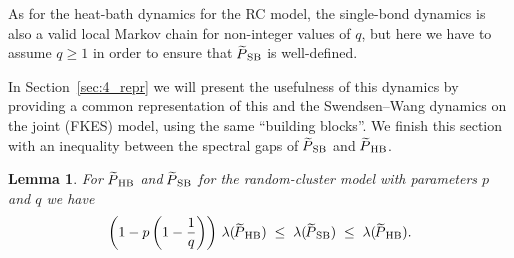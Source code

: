 \documentclass{dis}
\newtheorem{lemma}[theorem]{Lemma}
\theoremstyle{citing}
\begin{document}
As for the heat-bath dynamics for the RC model, the single-bond 
dynamics is also a valid local Markov chain for non-integer 
values of $q$, but here we have to assume $q\ge1$ in order to 
ensure that ${{\raisebox{2pt}{ ${\widetilde{{}}}$ }\mkern-14mu P}_{\rm SB}}$ is well-defined.

In Section~\ref{sec:4_repr} we will present the usefulness of this 
dynamics by providing a common representation of this and 
the Swendsen--Wang dynamics on the joint ({FKES}) model, 
using the same ``building blocks''. 
We finish this section with an inequality between 
the spectral gaps of ${{\raisebox{2pt}{ ${\widetilde{{}}}$ }\mkern-14mu P}_{\rm SB}}$ and ${{\raisebox{2pt}{ ${\widetilde{{}}}$ }\mkern-14mu P}_{\rm HB}}$. 

\begin{lemma} \label{lemma:SB-HB}
For ${{\raisebox{2pt}{ ${\widetilde{{}}}$ }\mkern-14mu P}_{\rm HB}}$ and ${{\raisebox{2pt}{ ${\widetilde{{}}}$ }\mkern-14mu P}_{\rm SB}}$ for the random-cluster model with 
parameters $p$ and $q$ we have
\[
\left(1-p \left(1-\frac1q\right)\right)\, \lambda({{\raisebox{2pt}{ ${\widetilde{{}}}$ }\mkern-14mu P}_{\rm HB}}) 
\;\le\; \lambda({{\raisebox{2pt}{ ${\widetilde{{}}}$ }\mkern-14mu P}_{\rm SB}}) 
	\;\le\; \lambda({{\raisebox{2pt}{ ${\widetilde{{}}}$ }\mkern-14mu P}_{\rm HB}}). 
\]
\end{lemma}
\vspace{4mm}
\end{document}

